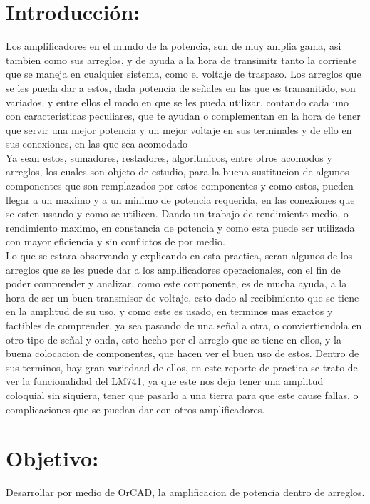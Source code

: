 \documentclass[12pt,a4paper]{article}
\begin{document}
\section{Introducción:}

Los amplificadores en el mundo de la potencia, son de muy amplia gama, asi tambien como sus arreglos, y de ayuda a la hora de transimitr tanto la corriente que se maneja en cualquier sistema, como el voltaje de traspaso. Los arreglos que se les pueda dar a estos, dada potencia de señales en las que es transmitido, son variados, y entre ellos el modo en que se les pueda utilizar, contando cada uno con caracteristicas peculiares, que te ayudan o complementan en la hora de tener que servir una mejor potencia y un mejor voltaje en sus terminales y de ello en sus conexiones, en las que sea acomodado\\

Ya sean estos, sumadores, restadores, algoritmicos, entre otros acomodos y arreglos, los cuales son objeto de estudio, para la buena sustitucion de algunos componentes que son remplazados por estos componentes y como estos, pueden llegar a un maximo y a un minimo de potencia requerida, en las conexiones que se esten usando y como se utilicen.  Dando un trabajo de rendimiento medio, o rendimiento maximo, en constancia de potencia y como esta puede ser utilizada con mayor eficiencia y sin conflictos de por medio.\\

Lo que se estara observando y explicando en esta practica, seran algunos de los arreglos que se les puede dar a los amplificadores operacionales, con el fin de poder comprender y analizar, como este componente, es de mucha ayuda, a la hora de ser un buen transmisor de voltaje, esto dado al recibimiento que se tiene en la amplitud de su uso, y como este es usado, en terminos mas exactos y factibles de comprender, ya sea pasando de una señal a otra, o conviertiendola en otro tipo de señal y onda, esto hecho por el arreglo que se tiene en ellos, y la buena colocacion de componentes, que hacen ver el buen uso de estos. Dentro de sus terminos, hay gran variedaad de ellos, en este reporte de practica se trato de ver la funcionalidad del LM741, ya que este nos deja tener una amplitud coloquial sin siquiera, tener que pasarlo a una tierra para que este cause fallas, o complicaciones que se puedan dar con otros amplificadores.\\



\section{Objetivo:}
Desarrollar por medio de OrCAD, la amplificacion de potencia dentro de arreglos.
\end{document}
